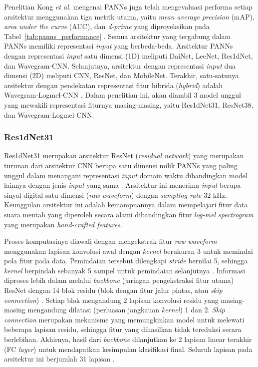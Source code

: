 Penelitian Kong \textit{et al.} mengenai PANNs juga telah mengevaluasi performa setiap arsitektur menggunakan tiga metrik utama, yaitu \textit{mean average precision} (mAP), \textit{area under the curve} (AUC), dan \textit{d-prime} yang diproyeksikan pada Tabel~\ref{tab:panns_performance} \cite{kong2020panns}.
Semua arsitektur yang tergabung dalam PANNs memiliki representasi \textit{input} yang berbeda-beda.
Arsitektur PANNs dengan representasi \textit{input} satu dimensi (1D) meliputi DaiNet, LeeNet, Res1dNet, dan Wavegram-CNN. 
Selanjutnya, arsitektur dengan representasi \textit{input} dua dimensi (2D) meliputi CNN, ResNet, dan MobileNet.
Terakhir, satu-satunya arsitektur dengan pendekatan representasi fitur hibrida (\textit{hybrid}) adalah Wavegram-Logmel-CNN \cite{kong2020panns}.
Dalam penelitian ini, akan diambil 3 model unggul yang mewakili representasi fiturnya masing-masing, yaitu Res1dNet31, ResNet38, dan Wavegram-Logmel-CNN. \par

\subsubsection{Res1dNet31} \label{II.Teori8.1}
Res1dNet31 merupakan arsitektur ResNet (\textit{residual network}) yang merupakan turunan dari arsitektur CNN berupa satu dimensi milik PANNs yang paling unggul dalam menangani representasi \textit{input} domain waktu dibandingkan model lainnya dengan jenis \textit{input} yang sama \cite{kong2020panns}.
Arsitektur ini menerima \textit{input} berupa sinyal digital satu dimensi (\textit{raw waveform}) dengan \textit{sampling rate} 32 kHz.
Keunggulan arsitektur ini adalah kemampuannya dalam mempelajari fitur data suara mentah yang diperoleh secara alami dibandingkan fitur \textit{log-mel spectrogram} yang merupakan \textit{hand-crafted features}. \par

Proses komputasinya diawali dengan mengekstrak fitur \textit{raw waveform} menggunakan lapisan konvolusi awal dengan \textit{kernel} berukuran 3 untuk memindai pola fitur pada data. 
Pemindaian tersebut dilengkapi \textit{stride} bernilai 5, sehingga \textit{kernel} berpindah sebanyak 5 sampel untuk pemindaian selanjutnya \cite{kong2020panns}.
Informasi diproses lebih dalam melalui \textit{backbone} (jaringan pengekstraksi fitur utama) ResNet dengan 14 blok residu (blok dengan fitur jalur pintas, atau \textit{skip connection}) \cite{he2016deep}.
Setiap blok mengandung 2 lapisan konvolusi residu yang masing-masing mengandung dilatasi (perluasan jangkauan \textit{kernel}) 1 dan 2.
\textit{Skip connection} merupakan mekanisme yang memungkinkan model untuk melewati beberapa lapisan residu, sehingga fitur yang dihasilkan tidak tereduksi secara berlebihan. 
Akhirnya, hasil dari \textit{backbone} dilanjutkan ke 2 lapisan linear terakhir (FC \textit{layer}) untuk mendapatkan kesimpulan klasifikasi final.
Seluruh lapisan pada arsitektur ini berjumlah 31 lapisan \cite{kong2020panns}. \par

